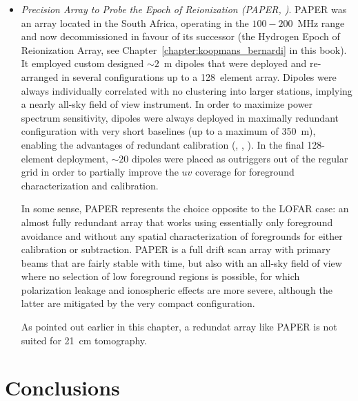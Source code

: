 {\begin{itemize}
The MWA approach has, however, limitations too: the regular station grid (without any rotation, unlike LOFAR) generates strong sidelobes (see Figure~\ref{fig:fig3}) which make calibration and foreground separation more challenging; the large field of view requires more comprehensive sky models fore calibration and is more susceptible to polarization leakage; the relatively short maximum baseline may be insufficient to derive accurate sky models (\cite{procopio17}). 

\item {\it Precision Array to Probe the Epoch of Reionization (PAPER, \cite{parsons10})}. PAPER was an array located in the South Africa, operating in the $100-200$~MHz range and now decommissioned in favour of its successor (the Hydrogen Epoch of Reionization Array, see Chapter~\ref{chapter:koopmans_bernardi} in this book). It employed custom designed $\sim 2$~m dipoles that were deployed and re-arranged in several configurations up to a 128~element array. Dipoles were always individually correlated with no clustering into larger stations, implying a nearly all-sky field of view instrument. In order to maximize power spectrum sensitivity, dipoles were always deployed in maximally redundant configuration with very short baselines (up to a maximum of 350~m), enabling the advantages of redundant calibration (\cite{parsons14}, \cite{ali15}, \cite{jacobs15}). In the final 128-element deployment, $\sim 20$ dipoles were placed as outriggers out of the regular grid in order to partially improve the $uv$ coverage for foreground characterization and calibration. 

In some sense, PAPER represents the choice opposite to the LOFAR case: an almost fully redundant array that works using essentially only foreground avoidance and without any spatial characterization of foregrounds for either calibration or subtraction. PAPER is a full drift scan array with primary beams that are fairly stable with time, but also with an all-sky field of view where no selection of low foreground regions is possible, for which polarization leakage and ionospheric effects are more severe, although the latter are mitigated by the very compact configuration. 

As pointed out earlier in this chapter, a redundat array like PAPER is not suited for 21~cm tomography.
\end{itemize}


\section{Conclusions}
\label{sec:conclusions}

}
